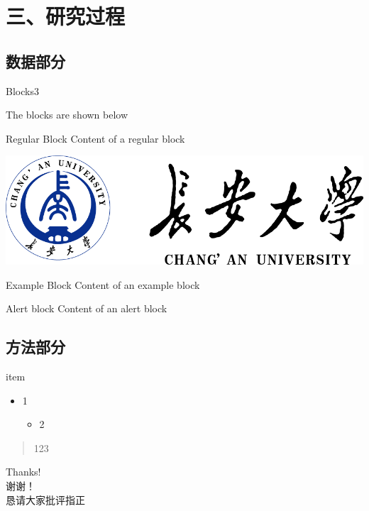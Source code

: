 \documentclass[10pt,aspectratio=169]{beamer} %
\begin{document}
	\section{三、研究过程}
	\subsection{数据部分}
	\begin{frame}[c]{Blocks3}
		
		The blocks are shown below
		\begin{block}{Regular Block}
			Content of a regular block
		\end{block}
		
		\includegraphics[width=0.7\linewidth]{logo/chdlogolong}	
		\begin{exampleblock}{Example Block}
			Content of an example block
		\end{exampleblock}
		
		\begin{alertblock}{Alert block}
			Content of an alert block
		\end{alertblock}
		
	\end{frame}
	\subsection{方法部分}
	\begin{frame}{item}
		\begin{itemize}[<+->]
			\item 1\\
			\begin{itemize}
				\item 2
			\end{itemize}
		\end{itemize}
		\begin{quotation}
			123
		\end{quotation}
	\end{frame}
	\begin{frame}%
		\vfill
		\centering
		{
			\centering \Huge \color{white} Thanks!\\谢谢！\\恳请大家批评指正
		}
		\vfill
	\end{frame}
\end{document}
